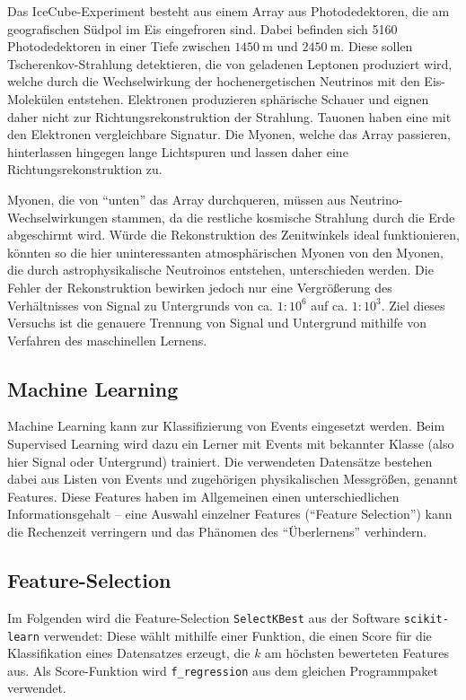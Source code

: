 Das IceCube-Experiment besteht aus einem Array aus Photodedektoren, die am geografischen Südpol im Eis eingefroren sind. Dabei befinden sich 5160 Photodedektoren in einer Tiefe zwischen $\SI{1450}{\meter}$ und $\SI{2450}{\meter}$. Diese sollen Tscherenkov-Strahlung detektieren, die von geladenen Leptonen produziert wird, welche durch die Wechselwirkung der hochenergetischen Neutrinos mit den Eis-Molekülen entstehen. Elektronen produzieren sphärische Schauer und eignen daher nicht zur Richtungsrekonstruktion der Strahlung. Tauonen haben eine mit den Elektronen vergleichbare Signatur. Die Myonen, welche das Array passieren, hinterlassen hingegen lange Lichtspuren und lassen daher eine Richtungsrekonstruktion zu.

Myonen, die von \enquote{unten} das Array durchqueren, müssen aus Neutrino-Wechselwirkungen stammen, da die restliche kosmische Strahlung durch die Erde abgeschirmt wird. Würde die Rekonstruktion des Zenitwinkels ideal funktionieren, könnten so die hier uninteressanten atmosphärischen Myonen von den Myonen, die durch astrophysikalische Neutroinos entstehen, unterschieden werden. Die Fehler der Rekonstruktion bewirken jedoch nur eine Vergrößerung des Verhältnisses von Signal zu Untergrunds von ca. $1:10^6$ auf ca. $1:10^3$. Ziel dieses Versuchs ist die genauere Trennung von Signal und Untergrund mithilfe von Verfahren des maschinellen Lernens.


\subsection{Machine Learning}
Machine Learning kann zur Klassifizierung von Events eingesetzt werden. Beim Supervised Learning wird dazu ein Lerner mit Events mit bekannter Klasse (also hier Signal oder Untergrund) trainiert. Die verwendeten Datensätze bestehen dabei aus Listen von Events und zugehörigen physikalischen Messgrößen, genannt Features. Diese Features haben im Allgemeinen einen unterschiedlichen Informationsgehalt -- eine Auswahl einzelner Features (\enquote{Feature Selection}) kann die Rechenzeit verringern und das Phänomen des \enquote{Überlernens} verhindern.

\subsection{Feature-Selection}
\label{fs}
Im Folgenden wird die Feature-Selection \texttt{SelectKBest} aus der Software \texttt{scikit-learn} \cite{scikit} verwendet: Diese wählt mithilfe einer Funktion, die einen Score für die Klassifikation eines Datensatzes erzeugt, die $k$ am höchsten bewerteten Features aus. Als Score-Funktion wird \texttt{f\_regression} aus dem gleichen Programmpaket verwendet.

